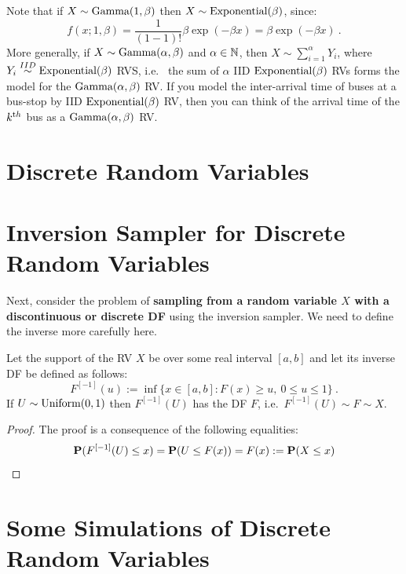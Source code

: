 Note that if $X \sim \mbox{{\rm Gamma}}(1,\beta)$ then $X \sim \mbox{{\rm Exponential}}(\beta)$, since:
\[
f(x;1,\beta)  
= \frac{1}{(1-1)!}  \beta \exp(-\beta x) = \beta \exp(-\beta x) \ .
\]
More generally, if $X \sim \mbox{{\rm Gamma}}(\alpha,\beta)$ and $\alpha \in \mathbb{N}$, then $X \sim \sum_{i=1}^{\alpha} Y_i$, where $Y_i \overset{IID}{\sim} \mbox{{\rm Exponential}}(\beta)$ RVS, i.e.~ the sum of $\alpha$ IID $\mbox{{\rm Exponential}}(\beta)$ RVs forms the model for the $\mbox{{\rm Gamma}}(\alpha,\beta)$ RV.  If you model the inter-arrival time of buses at a bus-stop by IID $\mbox{{\rm Exponential}}(\beta)$ RV, then you can think of the arrival time of the $k^{\text th}$ bus as a $\mbox{{\rm Gamma}}(\alpha,\beta)$ RV.

\section{Discrete Random Variables}

\section{Inversion Sampler for Discrete Random Variables}\label{S:InvSDiscrete}
Next, consider the problem of {\bf sampling from a random variable $X$ with a discontinuous or discrete DF} using the inversion sampler.  We need to define the inverse more carefully here.
\begin{prop}
Let the support of the RV $X$ be over some real interval $[a,b]$ and let its inverse DF be defined as follows:
\[
F^{[-1]}(u) := \inf\{ x \in [a,b]: F(x) \geq u, \ 0 \leq u \leq 1 \} \ .
\]
If $U \sim \mbox{{\rm Uniform}}(0,1)$ then $F^{[-1]}(U)$ has the DF $F$, i.e.~$F^{[-1]}(U) \sim F \sim X$.
\end{prop}
\begin{proof}
The proof is a consequence of the following equalities:
\[
\mathbf{P}(F^{[-1]}(U) \leq x) = \mathbf{P}(U \leq F(x)) = F(x) := \mathbf{P}(X \leq x)
\]
\end{proof}

\section{Some Simulations of Discrete Random Variables}\label{S:InvSDiscreteRVs}

